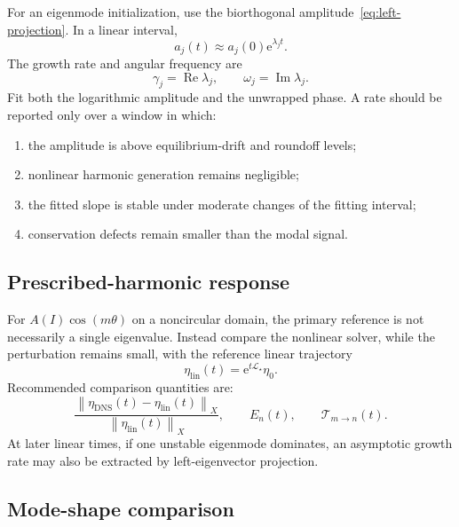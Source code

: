\documentclass[11pt,a4paper]{article}
\newcommand{\norm}[1]{\left\|#1\right\|}
\newcommand{\Lop}{\mathcal{L}_{\star}}
\newcommand{\e}{\mathrm{e}}
\begin{document}
For an eigenmode initialization, use the biorthogonal amplitude~\eqref{eq:left-projection}. In a linear interval,
\begin{equation}
  a_j(t)\approx a_j(0)\e^{\lambda_jt}.
  \label{eq:eigenmode-growth}
\end{equation}
The growth rate and angular frequency are
\begin{equation}
  \gamma_j=\operatorname{Re}\lambda_j,
  \qquad
  \omega_j=\operatorname{Im}\lambda_j.
  \label{eq:growth-frequency}
\end{equation}
Fit both the logarithmic amplitude and the unwrapped phase. A rate should be reported only over a window in which:
\begin{enumerate}
  \item the amplitude is above equilibrium-drift and roundoff levels;
  \item nonlinear harmonic generation remains negligible;
  \item the fitted slope is stable under moderate changes of the fitting interval;
  \item conservation defects remain smaller than the modal signal.
\end{enumerate}

\subsection{Prescribed-harmonic response}

For $A(I)\cos(m\theta)$ on a noncircular domain, the primary reference is not necessarily a single eigenvalue. Instead compare the nonlinear solver, while the perturbation remains small, with the reference linear trajectory
\begin{equation}
  \eta_{\mathrm{lin}}(t)=\e^{t\Lop}\eta_0.
  \label{eq:linear-reference-trajectory}
\end{equation}
Recommended comparison quantities are:
\begin{equation}
  \frac{\norm{\eta_{\mathrm{DNS}}(t)-\eta_{\mathrm{lin}}(t)}_X}
       {\norm{\eta_{\mathrm{lin}}(t)}_X},
  \qquad
  E_n(t),
  \qquad
  \mathcal{T}_{m\to n}(t).
  \label{eq:response-errors}
\end{equation}
At later linear times, if one unstable eigenmode dominates, an asymptotic growth rate may also be extracted by left-eigenvector projection.

\subsection{Mode-shape comparison}
\end{document}

